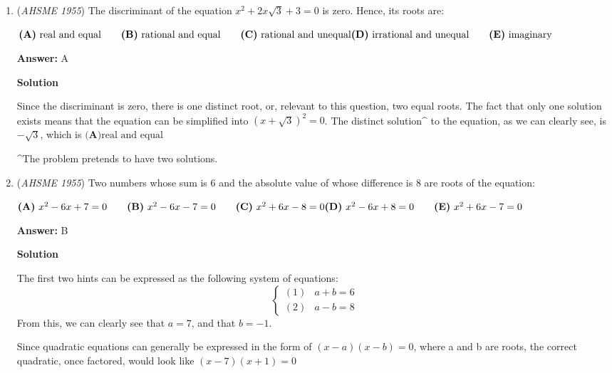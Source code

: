 \begin{enumerate}
 Learn more properties here: [\href{https://www.rapidtables.com/math/algebra/logarithm/Logarithm\_Rules.html}{[1]}]

 \textbf{Solving the Equation} $\log x-5 \log 3=-2$
$\log x- \log 3^5=-2$
$\log x- \log 243 =-2$
$\log x / 243 = -2$
$x/243 = 10^{-2}$
$x=\frac{243}{100}$$x=\boxed{\textbf{(C) }2.43}$



	\item (\textit{AHSME 1955}) The discriminant of the equation $x^2+2x\sqrt{3}+3=0$ is zero. Hence, its roots are: 


 $\textbf{(A)}\ \text{real and equal}\qquad\textbf{(B)}\ \text{rational and equal}\qquad\textbf{(C)}\ \text{rational and unequal}\\ \textbf{(D)}\ \text{irrational and unequal}\qquad\textbf{(E)}\ \text{imaginary}$

 \textbf{Answer: }A



\textbf{Solution}

Since the discriminant is zero, there is one distinct root, or, relevant to this question, two equal roots. The fact that only one solution exists means that the equation can be simplified into $(x + \sqrt{3})^2=0$. The distinct solution\textasciicircum{} to the equation, as we can clearly see, is $-\sqrt{3}$, which is $\textbf{(A)} \text{real and equal}$

 \textasciicircum{}The problem pretends to have two solutions.

 


	\item (\textit{AHSME 1955}) Two numbers whose sum is $6$ and the absolute value of whose difference is $8$ are roots of the equation: 


 $\textbf{(A)}\ x^2-6x+7=0\qquad\textbf{(B)}\ x^2-6x-7=0\qquad\textbf{(C)}\ x^2+6x-8=0\\ \textbf{(D)}\ x^2-6x+8=0\qquad\textbf{(E)}\ x^2+6x-7=0$

 \textbf{Answer: }B



\textbf{Solution}

The first two hints can be expressed as the following system of equations:
 \[\begin{cases} (1) & a + b = 6 \\ (2) & a - b = 8 \end{cases}\]From this, we can clearly see that $a = 7$, and that $b = -1$.

 Since quadratic equations can generally be expressed in the form of $(x - a)(x - b) = 0$, where a and b are roots, the correct quadratic, once factored, would look like $(x - 7)(x + 1) = 0$


\end{enumerate}
